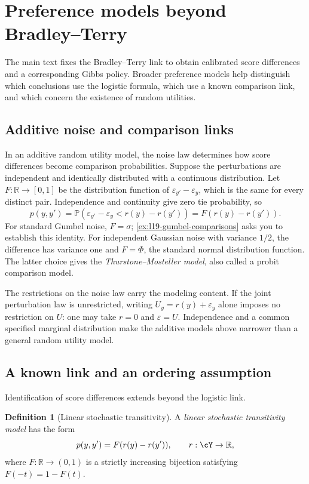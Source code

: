 \documentclass[11pt,twoside]{article}
\renewcommand{\P}{\mathbb P}
\newcommand{\R}{\mathbb R}
\theoremstyle{definition}
\newtheorem{definition}[theorem]{Definition}
\theoremstyle{remark}
\begin{document}
\clearpage
\appendix
\section{Preference models beyond Bradley--Terry}
\label{app:preference-models}

The main text fixes the Bradley--Terry link to obtain calibrated score
differences and a corresponding Gibbs policy. Broader preference models
help distinguish which conclusions use the logistic formula, which use
a known comparison link, and which concern the existence of random utilities.

\subsection{Additive noise and comparison links}

In an additive random utility model, the noise law determines how score
differences become comparison probabilities. Suppose the perturbations
are independent and identically distributed with a continuous distribution.
Let $F:\R\to[0,1]$ be the distribution function of
$\varepsilon_{y'}-\varepsilon_y$, which is the same for every distinct pair.
Independence and continuity give zero tie probability, so
\[
 p(y,y')=\P(\varepsilon_{y'}-\varepsilon_y<r(y)-r(y'))
 =F(r(y)-r(y')).
\]
For standard Gumbel noise, $F=\sigma$; \cref{ex:l19-gumbel-comparisons}
asks you to establish this identity. For independent Gaussian noise with
variance $1/2$, the difference has variance one and $F=\Phi$, the standard
normal distribution function. The latter choice gives the
\emph{Thurstone--Mosteller model}, also called a probit comparison model.

The restrictions on the noise law carry the modeling content.
If the joint perturbation law is unrestricted, writing $U_y=r(y)+\varepsilon_y$
alone imposes no restriction on $U$: one may take $r=0$ and $\varepsilon=U$.
Independence and a common specified marginal distribution make the additive
models above narrower than a general random utility model.

\subsection{A known link and an ordering assumption}

Identification of score differences extends beyond the logistic link.
\begin{definition}[Linear stochastic transitivity]
\label{def:linear-stochastic-transitivity}
A \emph{linear stochastic transitivity model} has the form
\[
 p(y,y')=F(r(y)-r(y')),\qquad r:\cY\to\R,
\]
where $F:\R\to(0,1)$ is a strictly increasing bijection satisfying
$F(-t)=1-F(t)$.
\end{definition}
\end{document}
